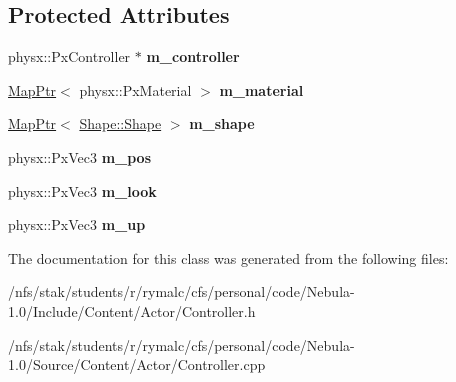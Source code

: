 \subsection*{Protected Attributes}
\begin{DoxyCompactItemize}
\item 
\hypertarget{classContent_1_1Controller_ada1bfa9c60bab5485c876a0a8b74fe11}{
physx::PxController $\ast$ {\bfseries m\_\-controller}}
\label{classContent_1_1Controller_ada1bfa9c60bab5485c876a0a8b74fe11}

\item 
\hypertarget{classContent_1_1Controller_a48c981f5102864ce3a97ee4037bd89c3}{
\hyperlink{classMapPtr}{MapPtr}$<$ physx::PxMaterial $>$ {\bfseries m\_\-material}}
\label{classContent_1_1Controller_a48c981f5102864ce3a97ee4037bd89c3}

\item 
\hypertarget{classContent_1_1Controller_ae58086cc7a7e66cf197fed6c7c989263}{
\hyperlink{classMapPtr}{MapPtr}$<$ \hyperlink{classContent_1_1Shape_1_1Shape}{Shape::Shape} $>$ {\bfseries m\_\-shape}}
\label{classContent_1_1Controller_ae58086cc7a7e66cf197fed6c7c989263}

\item 
\hypertarget{classContent_1_1Controller_af6146530689d59d74c68b7aae37d3ad9}{
physx::PxVec3 {\bfseries m\_\-pos}}
\label{classContent_1_1Controller_af6146530689d59d74c68b7aae37d3ad9}

\item 
\hypertarget{classContent_1_1Controller_aeed899bdbd46a3e3a3b210431a0e2829}{
physx::PxVec3 {\bfseries m\_\-look}}
\label{classContent_1_1Controller_aeed899bdbd46a3e3a3b210431a0e2829}

\item 
\hypertarget{classContent_1_1Controller_a61b6478a87e81377c0d649a5c8de9f0a}{
physx::PxVec3 {\bfseries m\_\-up}}
\label{classContent_1_1Controller_a61b6478a87e81377c0d649a5c8de9f0a}

\end{DoxyCompactItemize}


The documentation for this class was generated from the following files:\begin{DoxyCompactItemize}
\item 
/nfs/stak/students/r/rymalc/cfs/personal/code/Nebula-\/1.0/Include/Content/Actor/Controller.h\item 
/nfs/stak/students/r/rymalc/cfs/personal/code/Nebula-\/1.0/Source/Content/Actor/Controller.cpp\end{DoxyCompactItemize}
